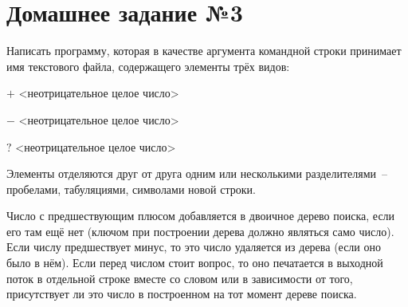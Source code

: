 \section*{Домашнее задание №3}


Написать программу, которая в качестве аргумента командной строки
принимает имя текстового файла, содержащего элементы трёх видов:

\begin{description}
\item{$+$} <неотрицательное целое число>
\item{$-$} <неотрицательное целое число>
\item{$?$} <неотрицательное целое число>
\end{description}

Элементы отделяются друг от друга одним или несколькими
разделителями~-- пробелами, табуляциями, символами новой строки.

Число
с предшествующим плюсом добавляется в двоичное дерево поиска, если
его там ещё нет (ключом при построении дерева должно являться само
число). Если числу предшествует минус, то это число удаляется из дерева
(если оно было в нём). Если перед числом стоит вопрос, то оно печатается
в выходной поток в отдельной строке вместе со словом  или  в
зависимости от того, присутствует ли это число в построенном на тот
момент дереве поиска.

